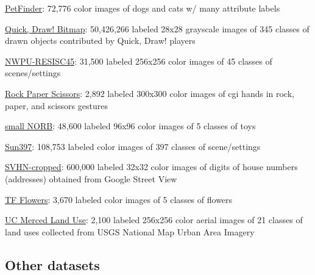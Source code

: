 \documentclass{tufte-handout}
\begin{document}
  \href{https://github.com/tensorflow/datasets/blob/master/docs/datasets.md\#pet_finder}{PetFinder}:
  72,776 color images of dogs and cats w/ many attribute labels
\item
  \href{https://github.com/tensorflow/datasets/blob/master/docs/datasets.md\#quickdraw_bitmap}{Quick,
  Draw! Bitmap}: 50,426,266 labeled 28x28 grayscale images of 345
  classes of drawn objects contributed by Quick, Draw! players
\item
  \href{https://github.com/tensorflow/datasets/blob/master/docs/datasets.md\#resisc45}{NWPU-RESISC45}:
  31,500 labeled 256x256 color images of 45 classes of scenes/settings
\item
  \href{https://github.com/tensorflow/datasets/blob/master/docs/datasets.md\#rock_paper_scissors}{Rock
  Paper Scissors}: 2,892 labeled 300x300 color images of cgi hands in
  rock, paper, and scissors gestures
\item
  \href{https://github.com/tensorflow/datasets/blob/master/docs/datasets.md\#smallnorb}{small
  NORB}: 48,600 labeled 96x96 color images of 5 classes of toys
\item
  \href{https://github.com/tensorflow/datasets/blob/master/docs/datasets.md\#sun397}{Sun397}:
  108,753 labeled color images of 397 classes of scene/settings
\item
  \href{https://github.com/tensorflow/datasets/blob/master/docs/datasets.md\#svhn_cropped}{SVHN-cropped}:
  600,000 labeled 32x32 color images of digits of house numbers
  (addresses) obtained from Google Street View
\item
  \href{https://github.com/tensorflow/datasets/blob/master/docs/datasets.md\#tf_flowers}{TF
  Flowers}: 3,670 labeled color images of 5 classes of flowers
\item
  \href{https://github.com/tensorflow/datasets/blob/master/docs/datasets.md\#uc_merced}{UC
  Merced Land Use}: 2,100 labeled 256x256 color aerial images of 21
  classes of land uses collected from USGS National Map Urban Area
  Imagery
\ei

\subsection*{Other datasets}\label{other-datasets}
\end{document}
